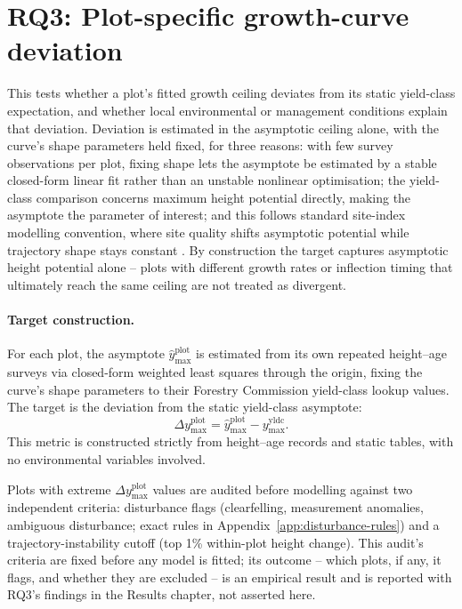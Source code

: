 \documentclass[11pt,a4paper]{report}
\begin{document}
\section{RQ3: Plot-specific growth-curve deviation}
\label{sec:rq3-target}
This tests whether a plot's fitted growth ceiling deviates from its static yield-class expectation, and whether local environmental or management conditions explain that deviation. Deviation is estimated in the asymptotic ceiling alone, with the curve's shape parameters held fixed, for three reasons: with few survey observations per plot, fixing shape lets the asymptote be estimated by a stable closed-form linear fit rather than an unstable nonlinear optimisation; the yield-class comparison concerns maximum height potential directly, making the asymptote the parameter of interest; and this follows standard site-index modelling convention, where site quality shifts asymptotic potential while trajectory shape stays constant \citep{socha2021Regional_C2_CR}. By construction the target captures asymptotic height potential alone -- plots with different growth rates or inflection timing that ultimately reach the same ceiling are not treated as divergent.

\paragraph*{Target construction.}
For each plot, the asymptote $\hat{y}_{\max}^{\text{plot}}$ is estimated from its own repeated height--age surveys via closed-form weighted least squares through the origin, fixing the curve's shape parameters to their Forestry Commission yield-class lookup values. The target is the deviation from the static yield-class asymptote:
\begin{equation}
\Delta y_{\max}^{\text{plot}} = \hat y_{\max}^{\text{plot}} - y_{\max}^{\text{yldc}}.
\label{eq:local-ymax-diff}
\end{equation}
This metric is constructed strictly from height--age records and static tables, with no environmental variables involved.

Plots with extreme $\Delta y_{\max}^{\text{plot}}$ values are audited before modelling against two independent criteria: disturbance flags (clearfelling, measurement anomalies, ambiguous disturbance; exact rules in Appendix~\ref{app:disturbance-rules}) and a trajectory-instability cutoff (top 1\% within-plot height change). This audit's criteria are fixed before any model is fitted; its outcome -- which plots, if any, it flags, and whether they are excluded -- is an empirical result and is reported with RQ3's findings in the Results chapter, not asserted here.
\end{document}

